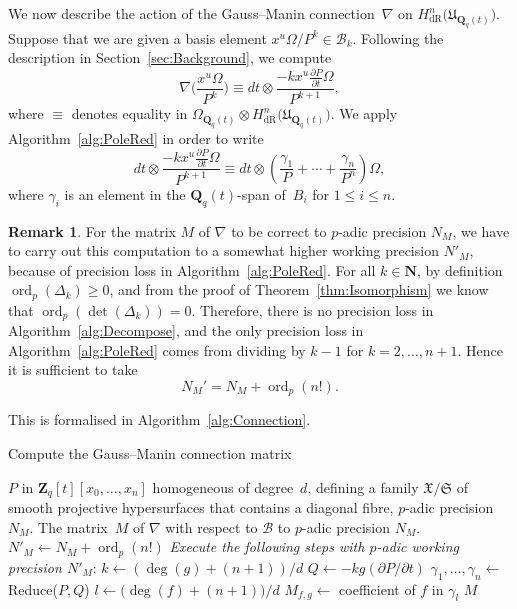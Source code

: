\documentclass[a4paper,11pt]{article}
\numberwithin{equation}{section}
\newcommand{\NN}{\mathbf{N}} %
\newcommand{\ZZ}{\mathbf{Z}} %
\newcommand{\QQ}{\mathbf{Q}} %
\DeclareMathOperator{\ord}{ord}          %
\providecommand{\HdR}{H_{\text{dR}}}    %
\providecommand{\cB}{\mathcal{B}} %
\theoremstyle{definition}
\newtheorem{rem}[thm]{Remark}
\begin{document}
We now describe the action of the Gauss--Manin connection~$\nabla$ on 
$\HdR^n\bigl(\mathfrak{U}_{\QQ_q(t)}\bigr)$.  Suppose that we are given a basis element 
$x^u \Omega / P^k \in \cB_k$.  Following the description in 
Section~\ref{sec:Background}, we compute
\begin{equation} \label{eqn:nabla}
\nabla \biggl(\frac{x^u \Omega}{P^k}\biggr) \equiv 
dt \otimes \frac{- k x^u \frac{\partial P}{\partial t} \Omega}{P^{k+1}},
\end{equation}
where $\equiv$ denotes equality in 
$\Omega_{\QQ_q(t)} \otimes \HdR^n\bigl(\mathfrak{U}_{\QQ_q(t)}\bigr)$. 
We apply Algorithm~\ref{alg:PoleRed} in order to write
\begin{equation}
dt \otimes \frac{- k x^u \frac{\partial P}{ \partial t} \Omega}{P^{k+1}} \equiv 
dt \otimes \left( \frac{\gamma_{1}}{P} + \dotsb + \frac{\gamma_n}{P^n} \right) \Omega,
\end{equation}
where $\gamma_i$ is an element in the $\QQ_q(t)$-span of~$B_i$ for $1 \leq i \leq n$. 

\begin{rem} \label{rem:precgm}
For the matrix $M$ of $\nabla$ to be correct to $p$-adic precision $N_M$, we have to 
carry out this computation to a somewhat higher working precision $N'_M$, because of 
precision loss in Algorithm~\ref{alg:PoleRed}. 
For all $k \in \NN$, by definition $\ord_p(\Delta_k) \geq 0$, and from the proof
of Theorem~\ref{thm:Isomorphism} we know that $\ord_p(\det(\Delta_k))=0$. 
Therefore, there is no precision loss 
in Algorithm~\ref{alg:Decompose}, and the only precision loss in Algorithm~\ref{alg:PoleRed} 
comes from dividing by $k-1$ for $k=2,\dotsc,n+1$. Hence it is sufficient to take 
\begin{equation*}
N_M'=N_M + \ord_p(n!).
\end{equation*}
\end{rem}
This is formalised in Algorithm~\ref{alg:Connection}.

\begin{algorithm}
\caption{Compute the Gauss--Manin connection matrix}
\label{alg:Connection}
\begin{algorithmic}
\Require $P$ in $\ZZ_q[t][x_0, \dotsc, x_n]$ homogeneous of degree~$d$, 
         defining a family $\mathfrak{X}/\mathfrak{S}$ of smooth projective 
         hypersurfaces that contains a diagonal fibre, $p$-adic precision $N_M$.
\Ensure  The matrix~$M$ of $\nabla$ with respect to $\cB$ to $p$-adic precision $N_M$.
\State $N'_M \gets N_M + \ord_p(n!)$
\State \textit{Execute the following steps with $p$-adic working precision $N'_M$}:
\State $k \gets  (\deg(g)+(n+1))/d$
\State $Q \gets  - k g (\partial P / \partial t)$
\State $\gamma_{1}, \dotsc, \gamma_n \gets$ {\sc Reduce($P,Q$)} 
\State $l \gets \bigl(\deg(f)+(n+1)\bigr)/d$
\State $M_{f,g} \gets$ coefficient of $f$ in $\gamma_l$
\EndFor
\EndFor
\Return $M$
\EndProcedure
\end{algorithmic}
\end{algorithm}
\end{document}
